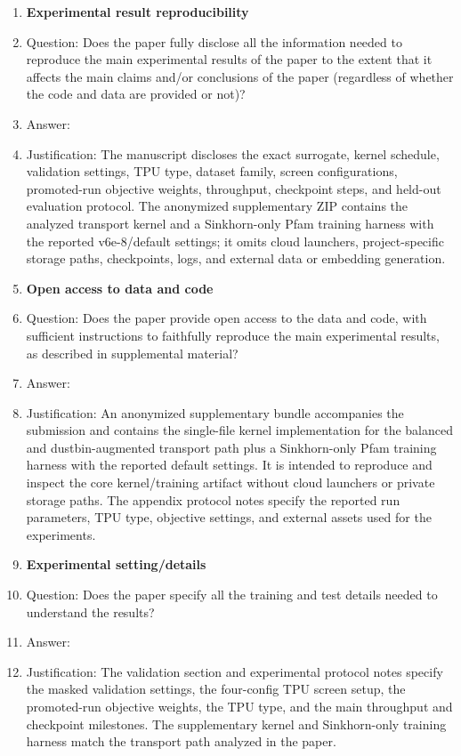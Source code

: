 \begin{enumerate}
\item {\bf Experimental result reproducibility}
    \item[] Question: Does the paper fully disclose all the information needed to reproduce the main experimental results of the paper to the extent that it affects the main claims and/or conclusions of the paper (regardless of whether the code and data are provided or not)?
    \item[] Answer: \answerYes{}
    \item[] Justification: The manuscript discloses the exact surrogate, kernel schedule, validation settings, TPU type, dataset family, screen configurations, promoted-run objective weights, throughput, checkpoint steps, and held-out evaluation protocol. The anonymized supplementary ZIP contains the analyzed transport kernel and a Sinkhorn-only Pfam training harness with the reported v6e-8/default settings; it omits cloud launchers, project-specific storage paths, checkpoints, logs, and external data or embedding generation.

\item {\bf Open access to data and code}
    \item[] Question: Does the paper provide open access to the data and code, with sufficient instructions to faithfully reproduce the main experimental results, as described in supplemental material?
    \item[] Answer: \answerYes{}
    \item[] Justification: An anonymized supplementary bundle accompanies the submission and contains the single-file kernel implementation for the balanced and dustbin-augmented transport path plus a Sinkhorn-only Pfam training harness with the reported default settings. It is intended to reproduce and inspect the core kernel/training artifact without cloud launchers or private storage paths. The appendix protocol notes specify the reported run parameters, TPU type, objective settings, and external assets used for the experiments.

\item {\bf Experimental setting/details}
    \item[] Question: Does the paper specify all the training and test details needed to understand the results?
    \item[] Answer: \answerYes{}
    \item[] Justification: The validation section and experimental protocol notes specify the masked validation settings, the four-config TPU screen setup, the promoted-run objective weights, the TPU type, and the main throughput and checkpoint milestones. The supplementary kernel and Sinkhorn-only training harness match the transport path analyzed in the paper.


\end{enumerate}
